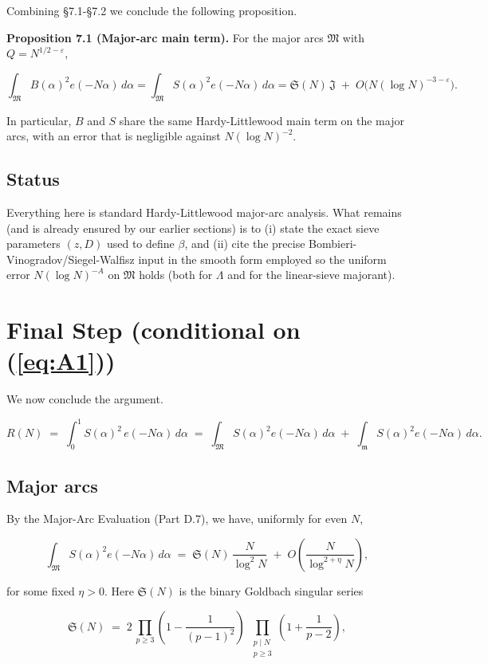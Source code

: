 \documentclass[11pt]{article}
\def\eqref#1{(\ref{#1})}%
\theoremstyle{definition}
\theoremstyle{remark}
\numberwithin{equation}{part}
\begin{document}
Combining §7.1-§7.2 we conclude the following proposition.

\noindent\textbf{Proposition 7.1 (Major-arc main term).} For the major arcs $\mathfrak M$ with $Q=N^{1/2-\varepsilon}$,

$$
	\int_{\mathfrak M} B(\alpha)^2 e(-N\alpha)\,d\alpha
	=\int_{\mathfrak M} S(\alpha)^2 e(-N\alpha)\,d\alpha
	=\mathfrak S(N)\,\mathfrak J\;+\;O\!\big(N(\log N)^{-3-\varepsilon}\big).
$$

In particular, $B$ and $S$ share the same Hardy-Littlewood main term on the major arcs, with an error that is negligible against $N(\log N)^{-2}$.

\subsection{Status}
Everything here is standard Hardy-Littlewood major-arc analysis. What remains (and is already ensured by our earlier sections) is to (i) state the exact sieve parameters $(z,D)$ used to define $\beta$, and (ii) cite the precise Bombieri-Vinogradov/Siegel-Walfisz input in the smooth form employed so the uniform error $N(\log N)^{-A}$ on $\mathfrak M$ holds (both for $\Lambda$ and for the linear-sieve majorant).
\section{Final Step (conditional on \eqref{eq:A1})}

We now conclude the argument.

$$
	R(N)\;=\;\int_0^1 S(\alpha)^2\,e(-N\alpha)\,d\alpha
	\;=\;\int_{\mathfrak M} S(\alpha)^2 e(-N\alpha)\,d\alpha
	\;+\;\int_{\mathfrak m} S(\alpha)^2 e(-N\alpha)\,d\alpha.
$$

\subsection{Major arcs}

By the Major-Arc Evaluation (Part D.7), we have, uniformly for even $N$,

$$
	\int_{\mathfrak M} S(\alpha)^2 e(-N\alpha)\,d\alpha
	\;=\;\mathfrak S(N)\,\frac{N}{\log^2 N}\;+\;O\!\left(\frac{N}{\log^{2+\eta}N}\right),
$$

for some fixed $\eta>0$. Here $\mathfrak S(N)$ is the binary Goldbach singular series

$$
	\mathfrak S(N)
	\;=\;2\,\prod_{p\ge 3}\!\left(1-\frac{1}{(p-1)^2}\right)
	\;\prod_{\substack{p\mid N\\ p\ge 3}}\!\!\left(1+\frac{1}{p-2}\right),
$$
\end{document}
